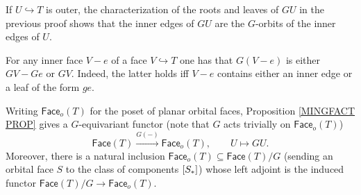 \documentclass[a4paper,10pt
 ,draft
]{article}%
\begin{document}
\begin{remark}\label{GOUT REM}
If $U \hookrightarrow T$ is outer, the characterization of the roots and leaves of $GU$ in the previous proof shows that
the inner edges of $GU$ are the $G$-orbits of the inner edges of $U$.
\end{remark}


\begin{remark}\label{GINNER REM}
	For any inner face $V-e$ 
	of a face $V \hookrightarrow T$ one has 
	that $G(V-e)$ is either $GV - Ge$ or $GV$.
	Indeed, the latter holds iff $V-e$ contains either an inner edge or a leaf of the form $ge$.
\end{remark}


\begin{remark}
Writing $\mathsf{Face}_o(T)$ for the poset of planar orbital faces, Proposition \ref{MINGFACT PROP} gives a $G$-equivariant functor (note that $G$ acts trivially on $\mathsf{Face}_o(T)$)
\[
	\mathsf{Face}(T) \xrightarrow{G(-)} \mathsf{Face}_o(T),
\qquad
	U \mapsto GU.
\]
Moreover, there is a natural inclusion
$\mathsf{Face}_o(T) \subseteq \mathsf{Face}(T)/G$ (sending an orbital face $S$ to the class of components $[S_{\**}]$)
whose left adjoint is the induced functor 
$\mathsf{Face}(T)/G \to \mathsf{Face}_o(T)$.
\end{remark}
\end{document}

